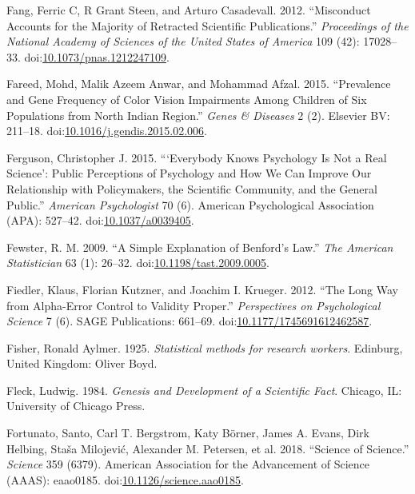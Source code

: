 \documentclass[a5paper]{book}
\begin{document}
\hypertarget{ref-doi:10.1073ux2fpnas.1212247109}{}
Fang, Ferric C, R Grant Steen, and Arturo Casadevall. 2012. ``Misconduct
Accounts for the Majority of Retracted Scientific Publications.''
\emph{Proceedings of the National Academy of Sciences of the United
States of America} 109 (42): 17028--33.
doi:\href{https://doi.org/10.1073/pnas.1212247109}{10.1073/pnas.1212247109}.

\hypertarget{ref-doi:10.1016ux2fj.gendis.2015.02.006}{}
Fareed, Mohd, Malik Azeem Anwar, and Mohammad Afzal. 2015. ``Prevalence
and Gene Frequency of Color Vision Impairments Among Children of Six
Populations from North Indian Region.'' \emph{Genes \& Diseases} 2 (2).
Elsevier BV: 211--18.
doi:\href{https://doi.org/10.1016/j.gendis.2015.02.006}{10.1016/j.gendis.2015.02.006}.

\hypertarget{ref-doi:10.1037ux2fa0039405}{}
Ferguson, Christopher J. 2015. ```Everybody Knows Psychology Is Not a
Real Science': Public Perceptions of Psychology and How We Can Improve
Our Relationship with Policymakers, the Scientific Community, and the
General Public.'' \emph{American Psychologist} 70 (6). American
Psychological Association (APA): 527--42.
doi:\href{https://doi.org/10.1037/a0039405}{10.1037/a0039405}.

\hypertarget{ref-doi:10.1198ux2ftast.2009.0005}{}
Fewster, R. M. 2009. ``A Simple Explanation of Benford's Law.''
\emph{The American Statistician} 63 (1): 26--32.
doi:\href{https://doi.org/10.1198/tast.2009.0005}{10.1198/tast.2009.0005}.

\hypertarget{ref-doi:10.1177ux2f1745691612462587}{}
Fiedler, Klaus, Florian Kutzner, and Joachim I. Krueger. 2012. ``The
Long Way from Alpha-Error Control to Validity Proper.''
\emph{Perspectives on Psychological Science} 7 (6). SAGE Publications:
661--69.
doi:\href{https://doi.org/10.1177/1745691612462587}{10.1177/1745691612462587}.

\hypertarget{ref-Fisher1925-jl}{}
Fisher, Ronald Aylmer. 1925. \emph{Statistical methods for research
workers}. Edinburg, United Kingdom: Oliver Boyd.

\hypertarget{ref-isbn:9780226253251}{}
Fleck, Ludwig. 1984. \emph{Genesis and Development of a Scientific
Fact}. Chicago, IL: University of Chicago Press.

\hypertarget{ref-doi:10.1126ux2fscience.aao0185}{}
Fortunato, Santo, Carl T. Bergstrom, Katy Börner, James A. Evans, Dirk
Helbing, Staša Milojević, Alexander M. Petersen, et al. 2018. ``Science
of Science.'' \emph{Science} 359 (6379). American Association for the
Advancement of Science (AAAS): eaao0185.
doi:\href{https://doi.org/10.1126/science.aao0185}{10.1126/science.aao0185}.
\end{document}
